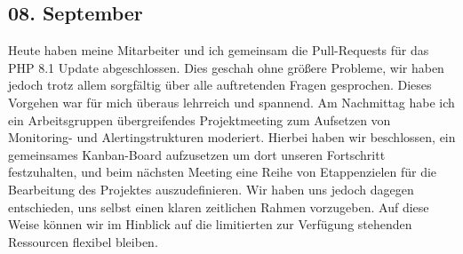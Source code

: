 \subsection{08. September}
Heute haben meine Mitarbeiter und ich gemeinsam die Pull-Requests für das PHP 8.1 Update abgeschlossen. Dies geschah ohne größere Probleme, wir haben jedoch trotz allem sorgfältig über alle auftretenden Fragen gesprochen. Dieses Vorgehen war für mich überaus lehrreich und spannend. Am Nachmittag habe ich ein Arbeitsgruppen übergreifendes Projektmeeting zum Aufsetzen von Monitoring- und Alertingstrukturen moderiert. Hierbei haben wir beschlossen, ein gemeinsames Kanban-Board aufzusetzen um dort unseren Fortschritt festzuhalten, und beim nächsten Meeting eine Reihe von Etappenzielen für die Bearbeitung des Projektes auszudefinieren. Wir haben uns jedoch dagegen entschieden, uns selbst einen klaren zeitlichen Rahmen vorzugeben. Auf diese Weise können wir im Hinblick auf die limitierten zur Verfügung stehenden Ressourcen flexibel bleiben.